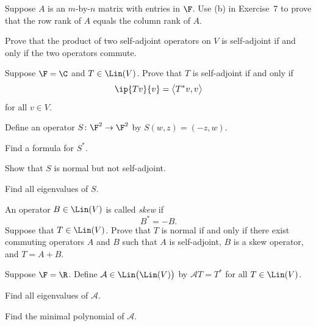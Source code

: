 \begin{exercise}
Suppose $A$ is an $m$-by-$n$ matrix with entries in $\F$. Use (b) in
Exercise~7 to prove that the row rank of $A$ equals the column rank of $A$.
\end{exercise}

\begin{exercise}
Prove that the product of two self-adjoint operators on $V$ is self-adjoint if
and only if the two operators commute.
\end{exercise}

\begin{exercise}
Suppose $\F=\C$ and $T\in\Lin(V)$. Prove that $T$ is self-adjoint if and only
if
\[ \ip{Tv}{v} = \bigl\langle T^*v,v\bigr\rangle \]
for all $v\in V$.
\end{exercise}

\begin{exercise}
Define an operator $S\colon\F^2\to\F^2$ by $S(w,z)=(-z,w)$.
\begin{parts}
\item Find a formula for $S^*$.
\item Show that $S$ is normal but not self-adjoint.
\item Find all eigenvalues of $S$.
\end{parts}
\end{exercise}

\begin{exercise}
An operator $B\in\Lin(V)$ is called \emph{skew} if
\[ B^* = -B. \]
Suppose that $T\in\Lin(V)$. Prove that $T$ is normal if and only if there exist
commuting operators $A$ and $B$ such that $A$ is self-adjoint, $B$ is a skew
operator, and $T=A+B$.
\end{exercise}

\begin{exercise}
Suppose $\F=\R$. Define $\mathcal{A}\in\Lin\bigl(\Lin(V)\bigr)$ by
$\mathcal{A}T=T^*$ for all $T\in\Lin(V)$.
\begin{parts}
\item Find all eigenvalues of $\mathcal{A}$.
\item Find the minimal polynomial of $\mathcal{A}$.
\end{parts}
\end{exercise}

